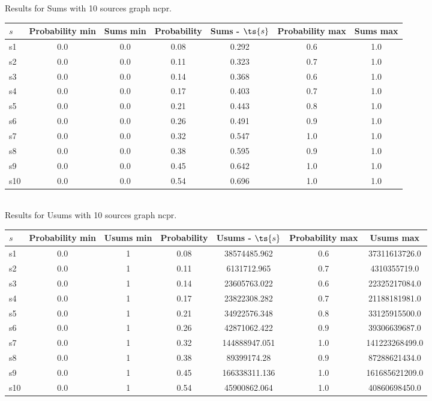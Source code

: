 \documentclass{article}
\begin{document}
\noindent Results for Sums with 10 sources graph ncpr.

\noindent\begin{tabular}{|l|c|c|c|c|c|c|}
\hline
$s$& Probability min & Sums min & Probability & Sums - $\ts{s}$ & Probability max & Sums max\\
\hline
s1 &0.0 & 0.0 & 0.08 & 0.292 & 0.6 & 1.0\\
\hline
s2 &0.0 & 0.0 & 0.11 & 0.323 & 0.7 & 1.0\\
\hline
s3 &0.0 & 0.0 & 0.14 & 0.368 & 0.6 & 1.0\\
\hline
s4 &0.0 & 0.0 & 0.17 & 0.403 & 0.7 & 1.0\\
\hline
s5 &0.0 & 0.0 & 0.21 & 0.443 & 0.8 & 1.0\\
\hline
s6 &0.0 & 0.0 & 0.26 & 0.491 & 0.9 & 1.0\\
\hline
s7 &0.0 & 0.0 & 0.32 & 0.547 & 1.0 & 1.0\\
\hline
s8 &0.0 & 0.0 & 0.38 & 0.595 & 0.9 & 1.0\\
\hline
s9 &0.0 & 0.0 & 0.45 & 0.642 & 1.0 & 1.0\\
\hline
s10 &0.0 & 0.0 & 0.54 & 0.696 & 1.0 & 1.0\\
\hline
\end{tabular}\\

\noindent Results for Usums with 10 sources graph ncpr.

\noindent\begin{tabular}{|l|c|c|c|c|c|c|}
\hline
$s$& Probability min & Usums min & Probability & Usums - $\ts{s}$ & Probability max & Usums max\\
\hline
s1 &0.0 & 1 & 0.08 & 38574485.962 & 0.6 & 37311613726.0\\
\hline
s2 &0.0 & 1 & 0.11 & 6131712.965 & 0.7 & 4310355719.0\\
\hline
s3 &0.0 & 1 & 0.14 & 23605763.022 & 0.6 & 22325217084.0\\
\hline
s4 &0.0 & 1 & 0.17 & 23822308.282 & 0.7 & 21188181981.0\\
\hline
s5 &0.0 & 1 & 0.21 & 34922576.348 & 0.8 & 33125915500.0\\
\hline
s6 &0.0 & 1 & 0.26 & 42871062.422 & 0.9 & 39306639687.0\\
\hline
s7 &0.0 & 1 & 0.32 & 144888947.051 & 1.0 & 141223268499.0\\
\hline
s8 &0.0 & 1 & 0.38 & 89399174.28 & 0.9 & 87288621434.0\\
\hline
s9 &0.0 & 1 & 0.45 & 166338311.136 & 1.0 & 161685621209.0\\
\hline
s10 &0.0 & 1 & 0.54 & 45900862.064 & 1.0 & 40860698450.0\\
\hline
\end{tabular}\\
\end{document}
